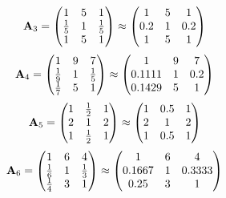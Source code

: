 \documentclass[10pt,a4paper]{article}
\begin{document}
	\[
		\bold{A}_{3} = 
		\begin{pmatrix}
			{1} {} & {{5}} {} & {1} {} \\
			\frac{1} {{5}} & {1} {} & \frac{1} {{5}} \\
			{1} {} & {{5}} {} & {1} {} \\
		\end{pmatrix}
		\approx
		\begin{pmatrix}
			1        & 5        & 1        \\
			0.2      & 1        & 0.2      \\
			1        & 5        & 1        \\
		\end{pmatrix}
	\]
	\[
		\bold{A}_{4} = 
		\begin{pmatrix}
			{1} {} & {{9}} {} & {{7}} {} \\
			\frac{1} {{9}} & {1} {} & \frac{1} {{5}} \\
			\frac{1} {{7}} & {{5}} {} & {1} {} \\
		\end{pmatrix}
		\approx
		\begin{pmatrix}
			1        & 9        & 7        \\
			0.1111   & 1        & 0.2      \\
			0.1429   & 5        & 1        \\
		\end{pmatrix}
	\]
	\[
		\bold{A}_{5} = 
		\begin{pmatrix}
			{1} {} & \frac{1} {{2}} & {1} {} \\
			{{2}} {} & {1} {} & {{2}} {} \\
			{1} {} & \frac{1} {{2}} & {1} {} \\
		\end{pmatrix}
		\approx
		\begin{pmatrix}
			1        & 0.5      & 1        \\
			2        & 1        & 2        \\
			1        & 0.5      & 1        \\
		\end{pmatrix}
	\]
	\[
		\bold{A}_{6} = 
		\begin{pmatrix}
			{1} {} & {{6}} {} & {{4}} {} \\
			\frac{1} {{6}} & {1} {} & \frac{1} {{3}} \\
			\frac{1} {{4}} & {{3}} {} & {1} {} \\
		\end{pmatrix}
		\approx
		\begin{pmatrix}
			1        & 6        & 4        \\
			0.1667   & 1        & 0.3333   \\
			0.25     & 3        & 1        \\
		\end{pmatrix}
	\]
\end{document}
